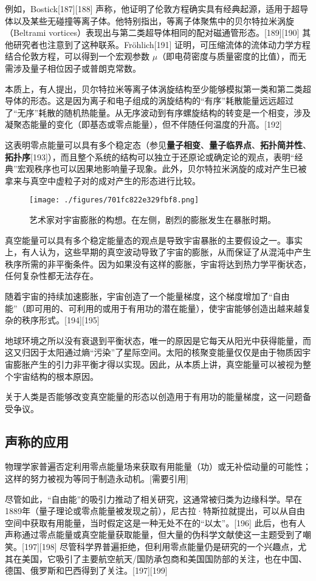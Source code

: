 例如，Bostick[187][188] 声称，他证明了伦敦方程确实具有经典起源，适用于超导体以及某些无碰撞等离子体。他特别指出，等离子体聚焦中的贝尔特拉米涡旋（Beltrami vortices）表现出与第二类超导体相同的配对磁通管形态。[189][190] 其他研究者也注意到了这种联系。Fröhlich[191] 证明，可压缩流体的流体动力学方程结合伦敦方程，可以得到一个宏观参数 \( \mu \)（即电荷密度与质量密度的比值），而无需涉及量子相位因子或普朗克常数。  

本质上，有人提出，贝尔特拉米等离子体涡旋结构至少能够模拟第一类和第二类超导体的形态。这是因为离子和电子组成的涡旋结构的“有序”耗散能量远远超过了“无序”耗散的随机热能量。从无序波动到有序螺旋结构的转变是一个相变，涉及凝聚态能量的变化（即基态或零点能量），但不伴随任何温度的升高。[192]  

这表明零点能量可以具有多个稳定态（参见\textbf{量子相变}、\textbf{量子临界点}、\textbf{拓扑简并性}、\textbf{拓扑序}[193]），而且整个系统的结构可以独立于还原论或确定论的观点，表明“经典”宏观秩序也可以因果地影响量子现象。此外，贝尔特拉米涡旋的成对产生已被拿来与真空中虚粒子对的成对产生的形态进行比较。
\begin{figure}[ht]
\centering
\texttt{[image: ./figures/701fc822e329fbf8.png]}
\caption{艺术家对宇宙膨胀的构想。在左侧，剧烈的膨胀发生在暴胀时期。} \label{fig_LD_15}
\end{figure}
真空能量可以具有多个稳定能量态的观点是导致宇宙暴胀的主要假设之一。事实上，有人认为，这些早期的真空波动导致了宇宙的膨胀，从而保证了从混沌中产生秩序所需的非平衡条件。因为如果没有这样的膨胀，宇宙将达到热力学平衡状态，任何复杂性都无法存在。

随着宇宙的持续加速膨胀，宇宙创造了一个能量梯度，这个梯度增加了“自由能”（即可用的、可利用的或用于有用功的潜在能量），使宇宙能够创造出越来越复杂的秩序形式。[194][195]  

地球环境之所以没有衰退到平衡状态，唯一的原因是它每天从阳光中获得能量，而这又归因于太阳通过熵“污染”了星际空间。太阳的核聚变能量仅仅是由于物质因宇宙膨胀产生的引力非平衡才得以实现。因此，从本质上讲，真空能量可以被视为整个宇宙结构的根本原因。

关于人类是否能够改变真空能量的形态以创造用于有用功的能量梯度，这一问题备受争议。
\subsection{声称的应用}
物理学家普遍否定利用零点能量场来获取有用能量（功）或无补偿动量的可能性；这样的努力被视为等同于制造永动机。[需要引用]  

尽管如此，“自由能”的吸引力推动了相关研究，这通常被归类为边缘科学。早在1889年（量子理论或零点能量被发现之前），尼古拉·特斯拉就提出，可以从自由空间中获取有用能量，当时假定这是一种无处不在的“以太”。[196] 此后，也有人声称通过零点能量或真空能量获取能量，但大量的伪科学文献使这一主题受到了嘲笑。[197][198] 尽管科学界普遍拒绝，但利用零点能量仍是研究的一个兴趣点，尤其在美国，它吸引了主要航空航天/国防承包商和美国国防部的关注，也在中国、德国、俄罗斯和巴西得到了关注。[197][199]  
